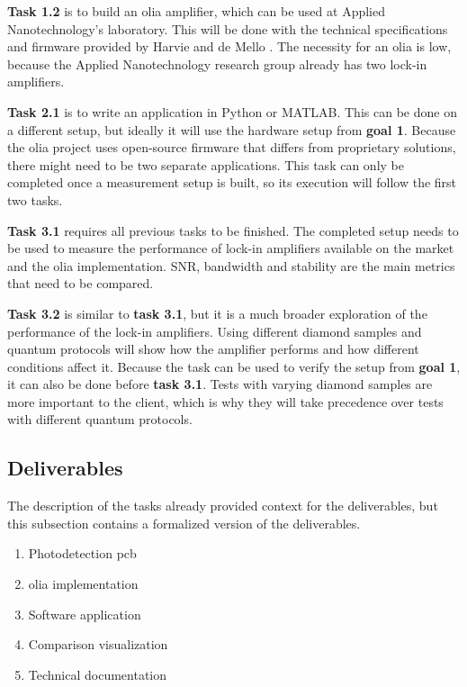 \textbf{Task 1.2} is to build an \gls{olia} amplifier, which can be used at Applied Nanotechnology's laboratory. This will be done with the technical specifications and firmware provided by Harvie and de Mello \cite{harvie2023olia}. The necessity for an \gls{olia} is low, because the Applied Nanotechnology research group already has two lock-in amplifiers.

\textbf{Task 2.1} is to write an application in Python or MATLAB. This can be done on a different setup, but ideally it will use the hardware setup from \textbf{goal 1}. Because the \gls{olia} project uses open-source firmware that differs from proprietary solutions, there might need to be two separate applications. This task can only be completed once a measurement setup is built, so its execution will follow the first two tasks.

\textbf{Task 3.1} requires all previous tasks to be finished. The completed setup needs to be used to measure the performance of lock-in amplifiers available on the market and the \gls{olia} implementation. SNR, bandwidth and stability are the main metrics that need to be compared.

\textbf{Task 3.2} is similar to \textbf{task 3.1}, but it is a much broader exploration of the performance of the lock-in amplifiers. Using different diamond samples and quantum protocols will show how the amplifier performs and how different conditions affect it. Because the task can be used to verify the setup from \textbf{goal 1}, it can also be done before \textbf{task 3.1}. Tests with varying diamond samples are more important to the client, which is why they will take precedence over tests with different quantum protocols.


\subsection{Deliverables}
The description of the tasks already provided context for the deliverables, but this subsection contains a formalized version of the deliverables.

\begin{enumerate}
	\item Photodetection \gls{pcb} 
	\item \gls{olia} implementation
	\item Software application
	\item Comparison visualization
	\item Technical documentation
\end{enumerate}

